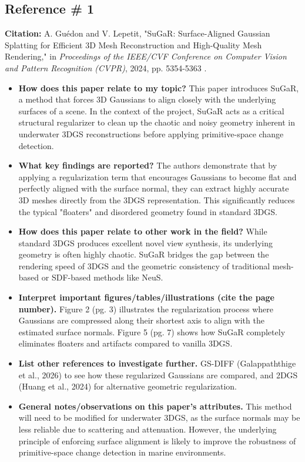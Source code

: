 \documentclass[12pt, a4paper]{article}
\begin{document}
\subsection*{Reference \# 1 }
\textbf{Citation:} A. Guédon and V. Lepetit, "SuGaR: Surface-Aligned Gaussian Splatting for Efficient 3D Mesh Reconstruction and High-Quality Mesh Rendering," in \textit{Proceedings of the IEEE/CVF Conference on Computer Vision and Pattern Recognition (CVPR)}, 2024, pp. 5354-5363 \cite{guedon2024sugar}.
\begin{itemize}
    \item \textbf{How does this paper relate to my topic?} This paper introduces SuGaR, a method that forces 3D Gaussians to align closely with the underlying surfaces of a scene. In the context of the project, SuGaR acts as a critical structural regularizer to clean up the chaotic and noisy geometry inherent in underwater 3DGS reconstructions before applying primitive-space change detection.
    \item \textbf{What key findings are reported?} The authors demonstrate that by applying a regularization term that encourages Gaussians to become flat and perfectly aligned with the surface normal, they can extract highly accurate 3D meshes directly from the 3DGS representation. This significantly reduces the typical "floaters" and disordered geometry found in standard 3DGS.
    \item \textbf{How does this paper relate to other work in the field?} While standard 3DGS produces excellent novel view synthesis, its underlying geometry is often highly chaotic. SuGaR bridges the gap between the rendering speed of 3DGS and the geometric consistency of traditional mesh-based or SDF-based methods like NeuS.
    \item \textbf{Interpret important figures/tables/illustrations (cite the page number).} Figure 2 (pg. 3) illustrates the regularization process where Gaussians are compressed along their shortest axis to align with the estimated surface normals. Figure 5 (pg. 7) shows how SuGaR completely eliminates floaters and artifacts compared to vanilla 3DGS.
    \item \textbf{List other references to investigate further.} GS-DIFF (Galappaththige et al., 2026) to see how these regularized Gaussians are compared, and 2DGS (Huang et al., 2024) for alternative geometric regularization.
    \item \textbf{General notes/observations on this paper’s attributes.} This method will need to be modified for underwater 3DGS, as the surface normals may be less reliable due to scattering and attenuation. However, the underlying principle of enforcing surface alignment is likely to improve the robustness of primitive-space change detection in marine environments.
\end{itemize}
\end{document}
